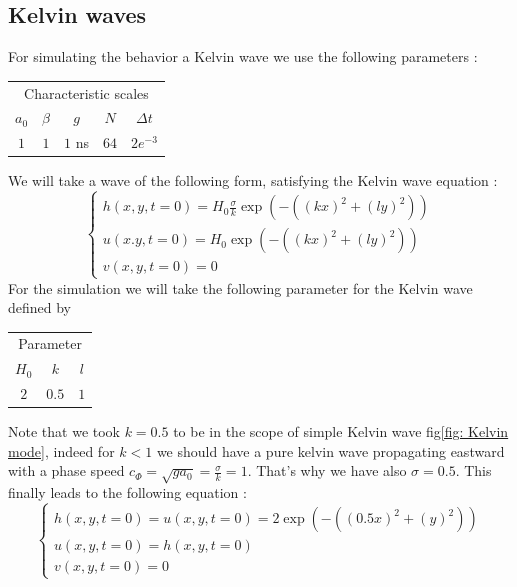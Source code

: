 \documentclass[11pt,a4paper]{report}
\begin{document}
\begin{multicols}{2}
    \subsection{Kelvin waves}

    For simulating the behavior a Kelvin wave we use the following parameters :

    \begin{center}
        \begin{tabular}{ccccc}
            \toprule
            \multicolumn{5}{c}{Characteristic scales}    \\
            \cmidrule{1 -5}
            $a_0$ & $\beta$ & $g$    & $N$  & $\Delta t$ \\
            \midrule
            $1$   & $1$     & $1$ ns & $64$ & $2e^{-3}$  \\
            \bottomrule
        \end{tabular}
    \end{center}

    We will take a wave of the following form, satisfying the Kelvin wave equation :
    \begin{equation}
        \label{eq:Kelvin wave}
        \begin{cases}
            h(x,y,t = 0) = H_0  \frac{\sigma}{k} \exp(- ((kx) ^2 +(ly)^ 2)) \\
            u(x.y, t = 0) = H_0 \exp(- ((kx) ^2 +(ly)^ 2))                  \\
            v(x,y,t=0) = 0
        \end{cases}
    \end{equation}
    For the simulation we will take the following parameter for the Kelvin wave defined by 
    \begin{center}
        \begin{tabular}{ccc}
            \toprule
            \multicolumn{3}{c}{Parameter} \\
            \cmidrule{1 -3}
            $H_0$ & $k$   & $l$           \\
            \midrule
            $2$   & $0.5$ & $1$           \\
            \bottomrule
        \end{tabular}
    \end{center}
    Note that we took $k = 0.5$ to be in the scope of simple Kelvin wave fig\ref{fig: Kelvin mode}, indeed for $k < 1$ we should have a pure kelvin wave propagating eastward with a phase speed $c_\Phi = \sqrt{ga_0} = \frac{\sigma}{k} = 1$. That's why we have also $\sigma = 0.5$.
    This finally leads to the following equation :
    \begin{equation}
        \label{eq:Kelvin wave}
        \begin{cases}
            h(x,y,t = 0) = u(x,y,t = 0) = 2 \exp(- ((0.5x) ^2 +(y)^ 2)) \\
            u(x,y,t = 0) = h(x,y,t = 0)                                 \\
            v(x,y,t=0) = 0
        \end{cases}
    \end{equation}

\end{multicols}
\end{document}
